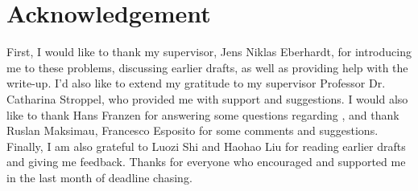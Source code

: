 \section*{Acknowledgement}
First, I would like to thank my supervisor, Jens Niklas Eberhardt, for introducing me to these problems, discussing earlier drafts, as well as providing help with the write-up.  I’d also like to extend my gratitude to my supervisor Professor Dr. Catharina Stroppel, who provided me with support and suggestions. I would also like to thank Hans Franzen for answering some questions regarding \cite{irelli2019cell}, and thank Ruslan Maksimau, Francesco Esposito for some comments and suggestions. Finally, I am also grateful to Luozi Shi and Haohao Liu for reading earlier drafts and giving me feedback. Thanks for everyone who encouraged and supported me in the last month of deadline chasing.

